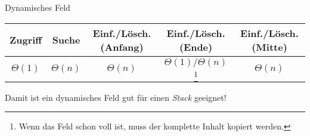 \documentclass[german]{../spicker}
\begin{document}
\begin{defi}{Dynamisches Feld}
    \begin{center}
        \begin{tabular}{c|c|c|c|c}
            Zugriff     & Suche       & Einf./Lösch. (Anfang) & Einf./Lösch. (Ende)                                                                                     & Einf./Lösch. (Mitte) \\
            \hline
            $\Theta(1)$ & $\Theta(n)$ & $\Theta(n)$           & $\Theta(1)/\Theta(n)$\footnote{Wenn das Feld schon voll ist, muss der komplette Inhalt kopiert werden.} & $\Theta(n)$          \\
        \end{tabular}
    \end{center}

    Damit ist ein dynamisches Feld gut für einen \emph{Stack} geeignet!
\end{defi}
\end{document}
